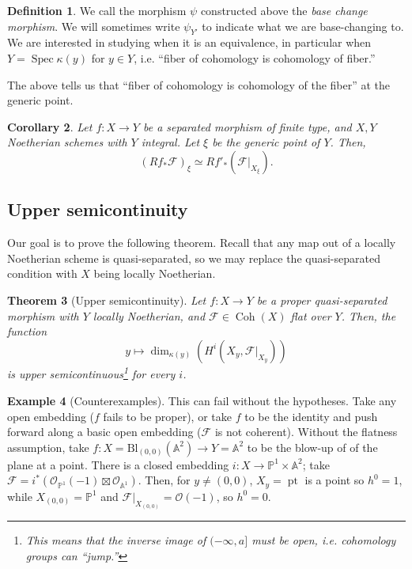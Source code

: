 \documentclass[10pt]{article}
\newtheorem{thm}{Theorem}[section]
\newtheorem{cor}[thm]{Corollary}
\theoremstyle{definition}
\newtheorem{exmp}[thm]{Example}
\newtheorem{defn}[thm]{Definition}
\DeclareMathOperator{\Coh}{Coh}
\DeclareMathOperator{\Spec}{Spec}
\DeclareMathOperator{\pt}{pt}
\newcommand{\OO}{\mathcal{O}}
\begin{document}
\begin{defn}
We call the morphism $\psi$ constructed above the \emph{base change morphism}.  We will sometimes write $\psi_{Y'}$ to indicate what we are base-changing to.  We are interested in studying when it is an equivalence, in particular when $Y = \Spec \kappa(y)$ for $y \in Y$, i.e. ``fiber of cohomology is cohomology of fiber.''
\end{defn}

The above tells us that ``fiber of cohomology is cohomology of the fiber'' at the generic point.
\begin{cor}
Let $f: X \rightarrow Y$ be a separated morphism of finite type, and $X, Y$ Noetherian schemes with $Y$ integral.  Let $\xi$ be the generic point of $Y$.  Then,
$$(Rf_* \mathcal{F})_\xi \simeq Rf'_*(\mathcal{F}|_{X_\xi}).$$
\end{cor}

\subsection{Upper semicontinuity}

Our goal is to prove the following theorem.  Recall that any map out of a locally Noetherian scheme is quasi-separated, so we may replace the quasi-separated condition with $X$ being locally Noetherian.
\begin{thm}[Upper semicontinuity]
Let $f: X \rightarrow Y$ be a proper quasi-separated morphism with $Y$ locally Noetherian, and $\mathcal{F} \in \Coh(X)$ flat over $Y$.  Then, the function
$$y \mapsto \dim_{\kappa(y)}(H^i(X_y, \mathcal{F}|_{X_y}))$$
is upper semicontinuous\footnote{This means that the inverse image of $(-\infty, a]$ must be open, i.e. cohomology groups can ``jump.''}  for every $i$.
\end{thm}

\begin{exmp}[Counterexamples]
This can fail without the hypotheses.  Take any open embedding ($f$ fails to be proper), or take $f$ to be the identity and push forward along a basic open embedding ($\mathcal{F}$ is not coherent).  Without the flatness assumption, take $f: X = \mathrm{Bl}_{(0,0)}(\mathbb{A}^2) \rightarrow Y = \mathbb{A}^2$ to be the blow-up of of the plane at a point.  There is a closed embedding $i: X \rightarrow \mathbb{P}^1 \times \mathbb{A}^2$; take $\mathcal{F} = i^* (\OO_{\mathbb{P}^1}(-1) \boxtimes \OO_{\mathbb{A}^1})$.  Then, for $y \ne (0,0)$, $X_y = \pt$ is a point so $h^0 = 1$, while $X_{(0,0)} = \mathbb{P}^1$ and $\mathcal{F}|_{X_{(0,0)}} = \OO(-1)$, so $h^0 = 0$.
\end{exmp}
\end{document}
